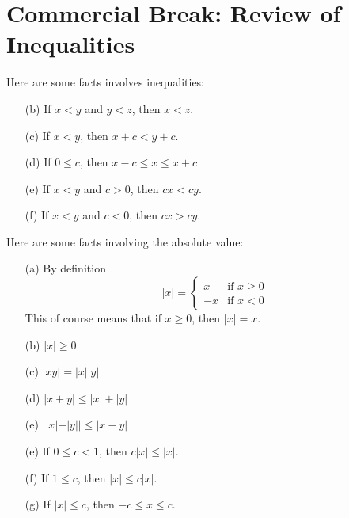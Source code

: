 \section{Commercial Break: Review of Inequalities}
Here are some facts involves inequalities:
\begin{itemize}
\item[(b)] If $x < y$ and $y < z$, then $x < z$.
\item[(c)] If $x < y$, then $x + c < y + c$.
\item[(d)] If $0 \leq c$, then $x - c \leq x \leq x + c$
\item[(e)] If $x < y$ and $c > 0$, then $cx < cy$.
\item[(f)] If $x < y$ and $c < 0$, then $cx > cy$.
\end{itemize}
Here are some facts involving the 
absolute value:
\begin{itemize}
\item[(a)] By definition
\[
|x| = 
\begin{cases}
x  & \text{if $x \geq 0$} \\
-x & \text{if $x < 0$}
\end{cases}
\]
This of course means that if $x \geq 0$, then $|x| = x$.
\item[(b)] $|x| \geq 0$
\item[(c)] $|xy| = |x||y|$
\item[(d)] $|x + y| \leq |x| + |y|$
\item[(e)] $||x| - |y|| \leq |x - y|$
\item[(e)] If $0 \leq c < 1$, then $c|x| \leq |x|$.
\item[(f)] If $1 \leq c$, then $|x| \leq c|x|$.
\item[(g)] If $|x| \leq c$, then $-c \leq x \leq c$.
\end{itemize}

